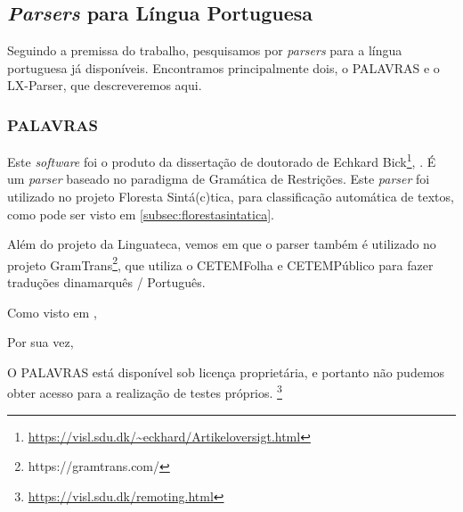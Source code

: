 \subsection{\textit{Parsers} para Língua Portuguesa}
\label{parser_portugues}
Seguindo a premissa do trabalho, pesquisamos por \textit{parsers} para a língua portuguesa já disponíveis. Encontramos principalmente dois, o PALAVRAS e o LX-Parser, que descreveremos aqui.

\subsubsection{PALAVRAS}
\label{subsec:palavras}

Este \textit{software} foi o produto da dissertação de doutorado de Echkard Bick\footnote{\url{https://visl.sdu.dk/~eckhard/Artikeloversigt.html}}, \cite{bick2000palavras}. É um \textit{parser} baseado no paradigma de Gramática de Restrições. Este \textit{parser} foi utilizado no projeto Floresta Sintá(c)tica, para classificação automática de textos, como pode ser visto em \ref{subsec:florestasintatica}.

Além do projeto da Linguateca, vemos em \cite{bick2000palavras} que o parser também é utilizado no projeto GramTrans\footnote{https://gramtrans.com/}, que utiliza o CETEMFolha e CETEMPúblico para fazer traduções dinamarquês / Português.

Como visto em \cite{linguatecaFloresta}, 
\begin{quote}
\end{quote}
Por sua vez,
\begin{quote}
\end{quote}
O PALAVRAS está disponível sob licença proprietária, e portanto não pudemos obter acesso para a realização de testes próprios. \footnote{\url{https://visl.sdu.dk/remoting.html}}

